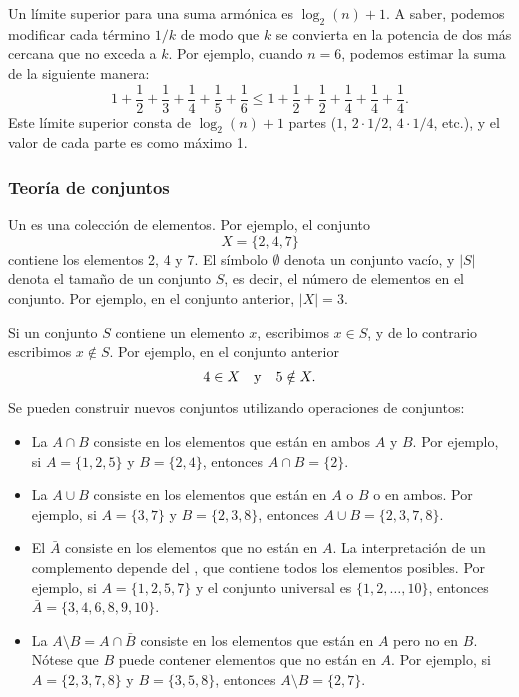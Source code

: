Un l\'imite superior para una suma arm\'onica es $\log_2(n)+1$.
A saber, podemos
modificar cada t\'ermino $1/k$ de modo que $k$ se convierta
en la potencia de dos m\'as cercana que no exceda a $k$.
Por ejemplo, cuando $n=6$, podemos estimar
la suma de la siguiente manera:
\[ 1+\frac{1}{2}+\frac{1}{3}+\frac{1}{4}+\frac{1}{5}+\frac{1}{6} \le
1+\frac{1}{2}+\frac{1}{2}+\frac{1}{4}+\frac{1}{4}+\frac{1}{4}.\]
Este l\'imite superior consta de $\log_2(n)+1$ partes
($1$, $2 \cdot 1/2$, $4 \cdot 1/4$, etc.),
y el valor de cada parte es como m\'aximo 1.

\subsubsection{Teor\'ia de conjuntos}


Un  es una colecci\'on de elementos.
Por ejemplo, el conjunto
\[X=\{2,4,7\}\]
contiene los elementos 2, 4 y 7.
El s\'imbolo $\emptyset$ denota un conjunto vac\'io,
y $|S|$ denota el tama\~no de un conjunto $S$,
es decir, el n\'umero de elementos en el conjunto.
Por ejemplo, en el conjunto anterior, $|X|=3$.

Si un conjunto $S$ contiene un elemento $x$,
escribimos $x \in S$,
y de lo contrario escribimos $x \notin S$.
Por ejemplo, en el conjunto anterior
\[4 \in X \hspace{10px}\textrm{y}\hspace{10px} 5 \notin X.\]

\begin{samepage}
Se pueden construir nuevos conjuntos utilizando operaciones de conjuntos:
\begin{itemize}
\item La  $A \cap B$ consiste en los elementos
que est\'an en ambos $A$ y $B$.
Por ejemplo, si $A=\{1,2,5\}$ y $B=\{2,4\}$,
entonces $A \cap B = \{2\}$.
\item La  $A \cup B$ consiste en los elementos
que est\'an en $A$ o $B$ o en ambos.
Por ejemplo, si $A=\{3,7\}$ y $B=\{2,3,8\}$,
entonces $A \cup B = \{2,3,7,8\}$.
\item El  $\bar A$ consiste en los elementos
que no est\'an en $A$.
La interpretaci\'on de un complemento depende del
, que contiene todos los elementos posibles.
Por ejemplo, si $A=\{1,2,5,7\}$ y el conjunto universal es
$\{1,2,\ldots,10\}$, entonces $\bar A = \{3,4,6,8,9,10\}$.
\item La  $A \setminus B = A \cap \bar B$
consiste en los elementos que est\'an en $A$ pero no en $B$.
N\'otese que $B$ puede contener elementos que no est\'an en $A$.
Por ejemplo, si $A=\{2,3,7,8\}$ y $B=\{3,5,8\}$,
entonces $A \setminus B = \{2,7\}$.
\end{itemize}
\end{samepage}

